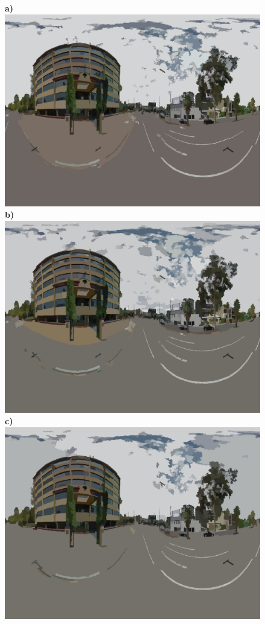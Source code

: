 \documentclass[final,3p,times,authoryear]{elsarticle}
\begin{document}
\begin{figure}
\centering    
\textbf{a)}\includegraphics[scale=0.08]{Images/mean/4880_3_6_100.png} 
\textbf{b)}\includegraphics[scale=0.08]{Images/mean/4880_7_6_100.png} 
\textbf{c)}\includegraphics[scale=0.08]{Images/mean/4880_5_7_210.png} 

\end{figure}
\end{document}
